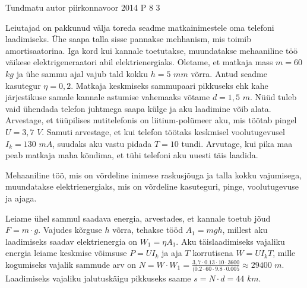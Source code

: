 {Tundmatu autor} %
{piirkonnavoor} %
{2014} %
{P 8} %
{3} %
{

\ifStatement
Leiutajad on pakkunud välja toreda seadme matkainimestele oma telefoni laadimiseks. Ühe saapa talla sisse pannakse mehhanism, mis toimib amortisaatorina. Iga kord kui kannale toetutakse, muundatakse mehaaniline töö väikese elektrigeneraatori abil elektrienergiaks. Oletame, et matkaja mass $m = 60$ $kg$ ja ühe sammu ajal vajub tald kokku $h = 5$ $mm$ võrra. Antud seadme kasutegur $\eta = 0,2$. Matkaja keskmiseks sammupaari pikkuseks ehk kahe järjestikuse samale kannale astumise vahemaaks võtame $d = 1,5$ $m$. Nüüd tuleb vaid ühendada telefon juhtmega saapa külge ja aku laadimine võib alata. Arvestage, et tüüpilises nutitelefonis on liitium-polümeer aku, mis töötab pingel $U = 3,7$ $V$. Samuti arvestage, et kui telefon töötaks keskmisel voolutugevusel $I_k = 130$ $mA$, suudaks aku vastu pidada $T = 10$ tundi. Arvutage, kui pika maa peab matkaja maha kõndima, et tühi telefoni aku uuesti täis laadida.
\fi

\ifHint
Mehaaniline töö, mis on võrdeline inimese raskusjõuga ja talla kokku vajumisega, muundatakse elektrienergiaks, mis on võrdeline kasuteguri, pinge, voolutugevuse ja ajaga.
\fi

\ifSolution
Leiame ühel sammul saadava energia, arvestades, et kannale toetub jõud $F = m \cdot g$. Vajudes kõrguse $h$ võrra, tehakse tööd $A_1 = mgh$, millest aku laadimiseks saadav elektrienergia on $W_1 = \eta A_1$. Aku täislaadimiseks vajaliku energia leiame keskmise võimsuse $P = UI_k$ ja aja $T$ korrutisena $W = UI_kT$, mille kogumiseks vajalik sammude arv on $N = W\cdot W_1 = \frac{3,7 \cdot 0.13 \cdot 10 \cdot 3600}{(0.2 \cdot 60 \cdot 9.8 \cdot 0.005} \approx 29400$ $m$. Laadimiseks vajaliku jalutuskäigu pikkuseks saame $s = N \cdot d = 44$ $km$.
\fi
}